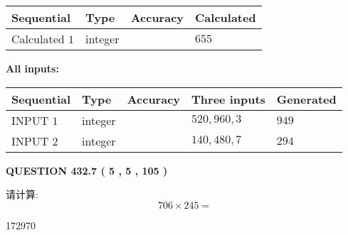 \documentclass{ctexart}
\begin{document}
   
   
   
\noindent{}
   
   
  
  
\noindent\begin{tabular}{|l|l|l|l|}
\hline
 Sequential & Type & Accuracy & Calculated \\ 
\hline
 
 
  Calculated $  1 $ & integer &  & 
  $ 655 $ 
 \\  \hline  
 \end{tabular}
   
   
   
   
\noindent\vspace{0.1in}\hspace{-0.08in} {\textbf{\Large{All inputs: }}}
   
   
  
  
\noindent\begin{tabular}{|l|l|l|l|l|}
\hline
 Sequential & Type & Accuracy & Three inputs & Generated \\ 
\hline
 
 
  INPUT $  1 $ & integer &  & $
 520
 , 
 960
 , 
 3
 $ & $ 949 $ 
 \\  \hline  
 
 
  INPUT $  2 $ & integer &  & $
 140
 , 
 480
 , 
 7
 $ & $ 294 $ 
 \\  \hline  
 \end{tabular}
   
   
  
\vspace{0.2in}
  
{\textbf{\Large{QUESTION
432.7 
 ( 5 , 5 , 105 )
}}}
  
  
 
请计算:
\begin{equation}
706  \times    %
245 = \nonumber
\end{equation}
 
 
 
\noindent{}
 
 

172970
 
 
\noindent{}
 
 

 
 
 
\noindent{}
 
\end{document}
